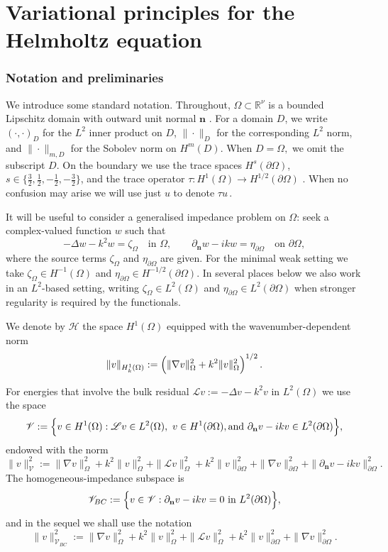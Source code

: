 \documentclass[twoside,11pt]{article}
\def\dimx{\nu }
\def\L{{\mathscr{L}}}
\def\normVB#1{\|#1\|_{\mathscr {V}_{BC}}}
\def\Hc{{\mathscr H}}
\def\Vc{{\mathscr V}}
\def\Vcbc{{\mathscr V}_{BC}}
\def\L{{\mathscr{L}}}
\begin{document}
{\section{Variational principles for the Helmholtz equation}
\label{sec:variational}

\subsubsection*{Notation and preliminaries}

We introduce some standard notation. {Throughout, $\Omega\subset\mathbb{R}^{\dimx}$ is a bounded Lipschitz domain with outward unit normal $\mathbf{n}$ \cite{Grisvard_book}.} For a domain $D$, we write $(\cdot,\cdot)_D$ for the
$L^2$ inner product on $D$, $\|\cdot\|_D$ for the corresponding 
$L^2$ norm, and $\|\cdot\|_{m,D}$ for the Sobolev norm on $H^m(D)$. When $D=\Omega,$ we omit the subscript $D.$ {On the boundary we use the trace spaces $H^s(\partial\Omega)$, $s\in\{\tfrac32,\tfrac12,-\tfrac12,-\tfrac32\}$, and the trace operator $\tau :H^1(\Omega)\to H^{1/2}(\partial\Omega)$ \cite{Lions_Magenes_I}. When no confusion may arise we will use just $u$ to denote $ \tau u\, .$ }

It will be useful to consider a generalised impedance problem on $\Omega$: seek {a} complex-valued function $w$ such that
\begin{equation}\label{eq:gen-Helm}
- \Delta w - k^2 w = \zeta_\Omega \quad \text{in } \Omega, 
\qquad \partial_{\mathbf{n}} w - i k  w = \eta_{\partial\Omega} \quad \text{on } \partial\Omega,
\end{equation}
where the source terms $\zeta_\Omega$ and $\eta_{\partial\Omega}$ are given. {For the minimal weak setting we take $\zeta_\Omega\in H^{-1}(\Omega)$ and $\eta_{\partial\Omega}\in H^{-1/2}(\partial\Omega)$. In several places below we also work in an $L^2$-based setting, writing $\zeta_\Omega\in L^2(\Omega)$ and $\eta_{\partial\Omega}\in L^2(\partial\Omega)$ when stronger regularity is required by the functionals.}

 {We denote  by $\Hc$ the space  $H^1(\Omega)$ equipped with the wavenumber-dependent norm 
\[
\|v\|_{H^1_k(\Omega)} := \Bigl(\|\nabla v\|_\Omega^2 + k^2 \|v\|_\Omega^2\Bigr)^{1/2}\, .
\]}

{For energies that involve the bulk residual $ \L v:=-\Delta v-k^2 v $ in $L^2(\Omega)$ we use the  space}
\[
\Vc := \Bigl\{  v\in H^1(\Omega) :  \L v \in L^2(\Omega),\ v\in H^1(\partial \Omega),  \text{and}\ \partial_{\mathbf{n}} v - i k  v \in  L^2(\partial \Omega ) 
 \Bigr\},
\]
{endowed with the norm}
\[
\|v\|_{\Vc}^2 := \|\nabla v\|_\Omega^2 + k^2 \|v\|_\Omega^2 + \|\L v\|_\Omega^2  + k ^2 \|v \|_{\partial \Omega} ^2  + \| \nabla v \|_{\partial \Omega} ^2 + \| \partial_{\mathbf{n}} v - i k  v \|_{\partial \Omega} ^2 .
\]
{The homogeneous-impedance subspace is}
\[
\Vcbc := \Bigl\{  v\in \Vc  :  \partial_{\mathbf{n}} v - i k  v = 0 \ \text{in } L^2(\partial\Omega)  \Bigr\},
\]
and in the sequel we shall use the notation
$$
  \normVB{v}^2:=\|\nabla v\|_\Omega^2 + k^2 \|v\|_\Omega^2 + \|\L v\|_\Omega^2 + k ^2 \|v \|_{\partial \Omega} ^2 +  \| \nabla v \|_{\partial \Omega} ^2 .
$$

}
\end{document}

